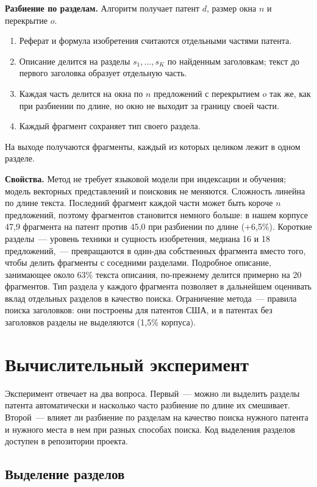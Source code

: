 \documentclass{article}
\begin{document}
\textbf{Разбиение по разделам.} Алгоритм получает патент $d$, размер окна $n$ и перекрытие $o$.
\begin{enumerate}
    \item Реферат и формула изобретения считаются отдельными частями патента.
    \item Описание делится на разделы $s_1, \ldots, s_K$ по найденным заголовкам; текст до первого заголовка образует отдельную часть.
    \item Каждая часть делится на окна по $n$ предложений с перекрытием $o$ так же, как при разбиении по длине, но окно не выходит за границу своей части.
    \item Каждый фрагмент сохраняет тип своего раздела.
\end{enumerate}
На выходе получаются фрагменты, каждый из которых целиком лежит в одном разделе.

\textbf{Свойства.} Метод не требует языковой модели при индексации и обучения; модель векторных представлений и поисковик не меняются. Сложность линейна по длине текста. Последний фрагмент каждой части может быть короче $n$ предложений, поэтому фрагментов становится немного больше: в нашем корпусе 47,9 фрагмента на патент против 45,0 при разбиении по длине (+6,5\%). Короткие разделы~--- уровень техники и сущность изобретения, медиана 16 и 18 предложений,~--- превращаются в один-два собственных фрагмента вместо того, чтобы делить фрагменты с соседними разделами. Подробное описание, занимающее около 63\% текста описания, по-прежнему делится примерно на 20 фрагментов. Тип раздела у каждого фрагмента позволяет в дальнейшем оценивать вклад отдельных разделов в качество поиска. Ограничение метода~--- правила поиска заголовков: они построены для патентов США, и в патентах без заголовков разделы не выделяются (1,5\% корпуса).

\section{Вычислительный эксперимент}\label{sec:exp}

Эксперимент отвечает на два вопроса. Первый~--- можно ли выделить разделы патента автоматически и насколько часто разбиение по длине их смешивает. Второй~--- влияет ли разбиение по разделам на качество поиска нужного патента и нужного места в нем при разных способах поиска. Код выделения разделов доступен в репозитории проекта.

\subsection{Выделение разделов}\label{sec:exp-sections}
\end{document}
